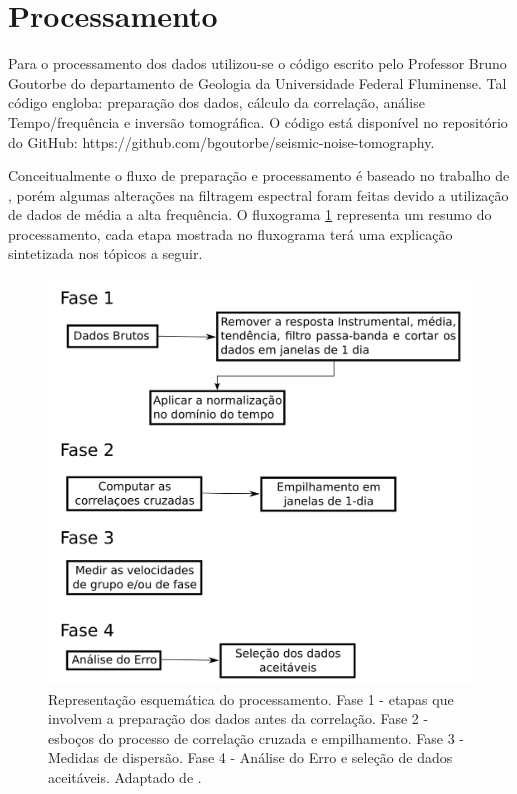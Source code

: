 \section{Processamento}

Para o processamento dos dados utilizou-se o código escrito pelo Professor Bruno Goutorbe do departamento de Geologia da Universidade Federal Fluminense. Tal código engloba: preparação dos dados, cálculo da correlação, análise Tempo/frequência e inversão tomográfica.  O código está disponível no repositório do GitHub: https://github.com/bgoutorbe/seismic-noise-tomography.

Conceitualmente o fluxo de preparação e processamento é baseado no trabalho de \cite{bensen_processing_2007}, porém algumas alterações na filtragem espectral  foram feitas devido a utilização de dados de média a alta frequência. O fluxograma \ref{fluxograma_bensen2007} representa um resumo do processamento, cada etapa mostrada no fluxograma terá uma explicação sintetizada nos tópicos a seguir.

\begin{figure}[!ht]
\centering
\includegraphics[scale=0.5]{Figs/fluxograma_bensen2007.png}
\caption[Representação esquemática do processamento.]{Representação esquemática do processamento. Fase 1 - etapas que involvem a preparação dos dados antes da correlação. Fase 2 - esboços do processo de correlação cruzada e empilhamento. Fase 3 -Medidas de dispersão. Fase 4 - Análise do Erro e seleção de dados aceitáveis. Adaptado de \cite{bensen_processing_2007}.}
\label{fluxograma_bensen2007}
\end{figure} 

